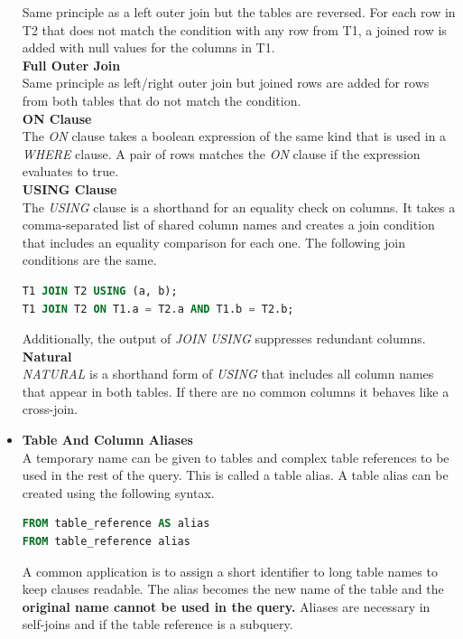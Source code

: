 \begin{addmargin}{-.5cm}
\begin{itemize}
Same principle as a left outer join but the tables are reversed. For each row in T2 that does not match the condition with any row from T1, a joined row is added with null values for the columns in T1.\vspace{.2cm}\\
\textbf{Full Outer Join}\\
Same principle as left/right outer join but joined rows are added for rows from both tables that do not match the condition.\vspace{.2cm}\\
\textbf{ON Clause}\\
The \textit{ON} clause takes a boolean expression of the same kind that is used in a \textit{WHERE} clause. A pair of rows matches the \textit{ON} clause if the expression evaluates to true.\vspace{.2cm}\\
\textbf{USING Clause}\\
The \textit{USING} clause is a shorthand for an equality check on columns. It takes a comma-separated list of shared column names and creates a join condition that includes an equality comparison for each one. The following join conditions are the same.
\begin{lstlisting}[language=SQL]
T1 JOIN T2 USING (a, b);
T1 JOIN T2 ON T1.a = T2.a AND T1.b = T2.b;
\end{lstlisting}
Additionally, the output of \textit{JOIN USING} suppresses redundant columns.\vspace{.2cm}\\
\textbf{Natural}\\
\textit{NATURAL} is a shorthand form of \textit{USING} that includes all column names that appear in both tables. If there are no common columns it behaves like a cross-join.
\item \textbf{Table And Column Aliases}\\
A temporary name can be given to tables and complex table references to be used in the rest of the query. This is called a table alias. A table alias can be created using the following syntax.
\begin{lstlisting}[language=SQL]
FROM table_reference AS alias
FROM table_reference alias
\end{lstlisting}
A common application is to assign a short identifier to long table names to keep clauses readable. The alias becomes the new name of the table and the \textbf{original name cannot be used in the query.} Aliases are necessary in self-joins and if the table reference is a subquery.\\

\end{itemize}
\end{addmargin}
